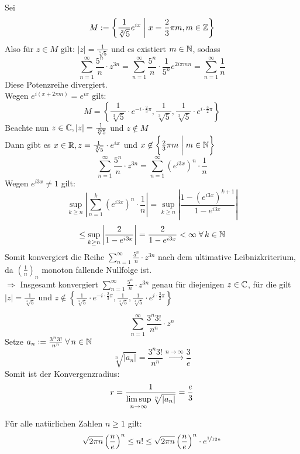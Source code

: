 \documentclass[../ana1u.tex]{subfiles}
\begin{document}
\begin{bsp}
    Sei 
    \[M := \left\{\frac{1}{\sqrt[3]{5}} e^{ix} \; \bigg \vert \; x = \frac{2}{3} \pi m, m \in \mathbb{Z} \right\}\]
    Also für \(z \in M \) gilt: \(|z| = \frac{1}{\sqrt[3]{5}} \) und es existiert \(m \in \mathbb{N} \), sodass
    \[\sum_{n=1}^{\infty} \frac{5^n}{n} \cdot z^{3n} = \sum_{n=1}^{\infty} \frac{5^n}{n} \cdot \frac{1}{5^n} e^{2 i \pi m n}
    = \sum_{n=1}^{\infty} \frac{1}{n} \]
    Diese Potenzreihe divergiert. \\
    Wegen \(e^{i(x + 2 \pi m)} = e^{ix} \) gilt:
    \[M = \left\{\frac{1}{\sqrt[3]{5}} \cdot e^{-i \cdot \frac{2}{3} \pi}, \frac{1}{\sqrt[3]{5}}, 
    \frac{1}{\sqrt[3]{5}} \cdot e^{i \cdot \frac{3}{2} \pi} \right\} \]
    Beachte nun \(z \in \mathbb{C}, |z| = \frac{1}{\sqrt[3]{5}} \) und \(z \not \in M \) \\
    Dann gibt es \(x \in \mathbb{R}, z = \frac{1}{\sqrt[3]{5}} \cdot e^{ix} \) und 
    \(x \not \in \left\{\frac{2}{3} \pi m \; \bigg \vert \; m \in \mathbb{N} \right\} \)
    \[\sum_{n=1}^{\infty} \frac{5^n}{n} \cdot z^{3n} = \sum_{n=1}^{\infty} (e^{i3x})^n \cdot \frac{1}{n} \]
    Wegen \(e^{i3x} \neq 1 \) gilt:
    \[\underset{k \geq n}{\sup} \left|\sum_{n=1}^{k} (e^{i3x})^n \cdot \frac{1}{n} \right| = 
    \underset{k \geq n}{\sup} \left|\frac{1-(e^{i3x})^{k+1}}{1-e^{i3x}} \right|\] 
    \[\leq \underset{k \geq n}{\sup} \left|\frac{2}{1-e^{i3x}} \right| = \frac{2}{1-e^{i3x}} < \infty \; \forall \, k \in \mathbb{N} \] 
    Somit konvergiert die Reihe \(\sum_{n=1}^{\infty} \frac{5^n}{n} \cdot z^{3n} \) nach dem ultimative Leibnizkriterium,
    da \((\frac{1}{n})_n \) monoton fallende Nullfolge ist. \\
    \(\Rightarrow \) Insgesamt konvergiert \(\sum_{n=1}^{\infty} \frac{5^n}{n} \cdot z^{3n} \) genau für diejenigen \(z \in \mathbb{C} \),
    für die gilt \( |z| = \frac{1}{\sqrt[3]{5}} \) und
    \(z \not \in \left\{\frac{1}{\sqrt[3]{5}} \cdot e^{-i \cdot \frac{2}{3} \pi}, \frac{1}{\sqrt[3]{5}}, 
    \frac{1}{\sqrt[3]{5}} \cdot e^{i \cdot \frac{3}{2} \pi} \right\} \)
\end{bsp}
\begin{bsp}
    \[\sum_{n=1}^{\infty} \frac{3^n 3!}{n^n} \cdot z^n \]
    Setze \( a_n := \frac{3^n 3!}{n^n} \; \forall \, n \in \mathbb{N} \)
    \[\sqrt[n]{|a_n|} = \frac{3^n 3!}{n^n} \overset{n \rightarrow \infty}{\longrightarrow} \frac{3}{e} \]
    Somit ist der Konvergenzradius:
    \[r = \frac{1}{\limsup\limits_{n\rightarrow\infty} \sqrt[n]{|a_n|}} = \frac{e}{3} \]
\end{bsp}
\begin{satz}
    Für alle natürlichen Zahlen \(n \geq 1 \) gilt:
\[\sqrt{2 \pi n} \left(\frac{n}{e}\right)^n \leq n! \leq \sqrt{2 \pi n} \left(\frac{n}{e}\right)^n \cdot e^{\nicefrac{1}{12n}} \]
\end{satz}
\end{document}
